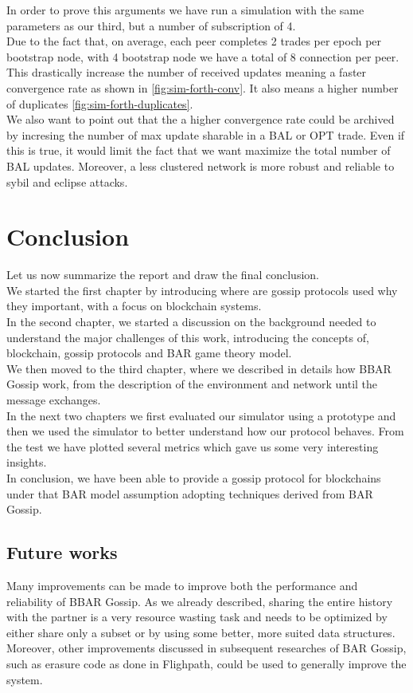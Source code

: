 \documentclass[mscthesis]{usiinfthesis}
\begin{document}
In order to prove this arguments we have run a simulation with the same parameters as our third, but a number of subscription of 4. \\
Due to the fact that, on average, each peer completes 2 trades per epoch per bootstrap node, with 4 bootstrap node we have a total of 8 connection per peer. This drastically increase the number of received updates meaning a faster convergence rate as shown in \ref{fig:sim-forth-conv}. It also means a higher number of duplicates \ref{fig:sim-forth-duplicates}. \\
We also want to point out that the a higher convergence rate could be archived by incresing the number of max update sharable in a BAL or OPT trade. Even if this is true, it would limit the fact that we want maximize the total number of BAL updates. Moreover, a less clustered network is more robust and reliable to sybil and eclipse attacks. 

\chapter{Conclusion}
Let us now summarize the report and draw the final conclusion. \\
We started the first chapter by introducing where are gossip protocols used why they important, with a focus on blockchain systems. \\
In the second chapter, we started a discussion on the background needed to understand the major challenges of this work, introducing the concepts of, blockchain, gossip protocols and BAR game theory model. \\
 We then moved to the third chapter, where we described in details how BBAR Gossip work, from the description of the environment and network until the message exchanges. \\
In the next two chapters we first evaluated our simulator using a prototype and then we used the simulator to better understand how our protocol behaves. From the test we have plotted several metrics which gave us some very interesting insights. \\
In conclusion, we have been able to provide a gossip protocol for blockchains under that BAR model assumption adopting techniques derived from BAR Gossip.
\section{Future works}
Many improvements can be made to improve both the performance and reliability of BBAR Gossip. As we already described, sharing the entire history with the partner is a very resource wasting task and needs to be optimized by either share only a subset or by using some better, more suited data structures. \\
Moreover, other improvements discussed in subsequent researches of BAR Gossip, such as erasure code as done in Flighpath\citep{li2008flightpath}, could be used to generally improve the system.



\end{document}

